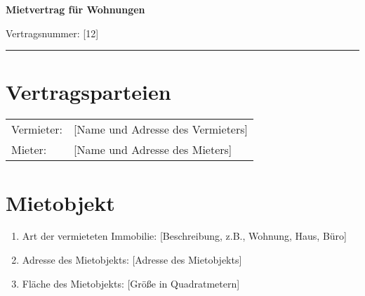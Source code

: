 \documentclass[a4paper,12pt]{article}
\begin{document}
\begin{minipage}{0.7\textwidth}
  \textbf{\Large {Mietvertrag für Wohnungen}} \\
\end{minipage}%
\begin{minipage}{0.3\textwidth}
  \begin{flushright}
    Vertragsnummer: [12]
  \end{flushright}
\end{minipage}

\textcolor{green}{\rule{\linewidth}{2pt}} %

\section*{Vertragsparteien}

\begin{tabular}{l l}
Vermieter: & [Name und Adresse des Vermieters] \\
Mieter: & [Name und Adresse des Mieters] \\
\end{tabular}

\section*{Mietobjekt}

\begin{enumerate}[label=(\alph*)]
\item Art der vermieteten Immobilie: [Beschreibung, z.B., Wohnung, Haus, Büro]
\item Adresse des Mietobjekts: [Adresse des Mietobjekts]
\item Fläche des Mietobjekts: [Größe in Quadratmetern]
\end{enumerate}

\end{document}
